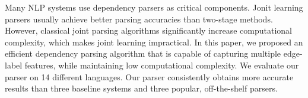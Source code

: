 Many NLP systems use dependency parsers as critical components. Jonit learning parsers usually achieve better parsing accuracies than two-stage methods. However, classical joint parsing algorithms significantly increase computational complexity, which makes joint learning impractical. In this paper, we proposed an efficient dependency parsing algorithm that is capable of capturing multiple edge-label features, while maintaining low computational complexity. We evaluate our parser on 14 different languages. Our parser consistently obtains more accurate results than three baseline systems and three popular, off-the-shelf parsers.
